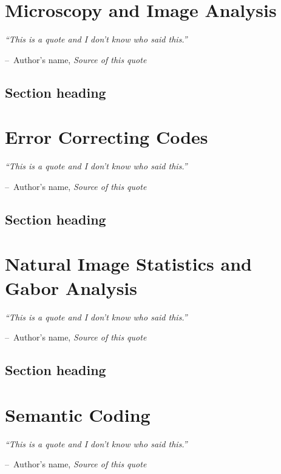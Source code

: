 \documentclass[a4paper,11pt]{book}
\makeatletter
\newenvironment{chapquote}[2][2em]
  {\setlength{\@tempdima}{#1}%
   \def\chapquote@author{#2}%
   \parshape 1 \@tempdima \dimexpr\textwidth-2\@tempdima\relax%
   \itshape}
  {\par\normalfont\hfill--\ \chapquote@author\hspace*{\@tempdima}\par\bigskip}
\makeatother
\begin{document}
\chapter{Microscopy and Image Analysis}

\begin{chapquote}{Author's name, \textit{Source of this quote}}
``This is a quote and I don't know who said this.''
\end{chapquote}

\section{Section heading}

\chapter{Error Correcting Codes}

\begin{chapquote}{Author's name, \textit{Source of this quote}}
``This is a quote and I don't know who said this.''
\end{chapquote}

\section{Section heading}

\chapter{Natural Image Statistics and Gabor Analysis}

\begin{chapquote}{Author's name, \textit{Source of this quote}}
``This is a quote and I don't know who said this.''
\end{chapquote}

\section{Section heading}

\chapter{Semantic Coding}

\begin{chapquote}{Author's name, \textit{Source of this quote}}
``This is a quote and I don't know who said this.''
\end{chapquote}
\end{document}
